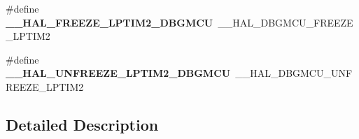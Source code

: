 \begin{DoxyCompactItemize}
\item 
\mbox{\label{group___h_a_l___d_b_g_m_c_u___aliased___macros_gad0e137ee9aa05347e1ffde48f9820f34}} 
\#define {\bfseries \+\_\+\+\_\+\+H\+A\+L\+\_\+\+F\+R\+E\+E\+Z\+E\+\_\+\+L\+P\+T\+I\+M2\+\_\+\+D\+B\+G\+M\+CU}~\+\_\+\+\_\+\+H\+A\+L\+\_\+\+D\+B\+G\+M\+C\+U\+\_\+\+F\+R\+E\+E\+Z\+E\+\_\+\+L\+P\+T\+I\+M2
\item 
\mbox{\label{group___h_a_l___d_b_g_m_c_u___aliased___macros_ga7490754801ed1bcaf3e31d15757a883c}} 
\#define {\bfseries \+\_\+\+\_\+\+H\+A\+L\+\_\+\+U\+N\+F\+R\+E\+E\+Z\+E\+\_\+\+L\+P\+T\+I\+M2\+\_\+\+D\+B\+G\+M\+CU}~\+\_\+\+\_\+\+H\+A\+L\+\_\+\+D\+B\+G\+M\+C\+U\+\_\+\+U\+N\+F\+R\+E\+E\+Z\+E\+\_\+\+L\+P\+T\+I\+M2
\end{DoxyCompactItemize}


\subsection{Detailed Description}

